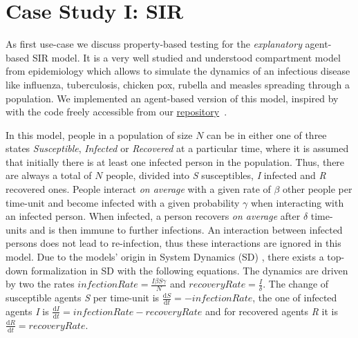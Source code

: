 \section{Case Study I: SIR}
\label{sec:case_SIR}
As first use-case we discuss property-based testing for the \textit{explanatory} agent-based SIR model. It is a very well studied and understood compartment model from epidemiology \cite{kermack_contribution_1927} which allows to simulate the dynamics of an infectious disease like influenza, tuberculosis, chicken pox, rubella and measles spreading through a population. We implemented an agent-based version of this model, inspired by  with the code freely accessible from our \href{https://github.com/thalerjonathan/haskell-sir}{repository}~\cite{sir_repo}.

In this model, people in a population of size $N$ can be in either one of three states \textit{Susceptible}, \textit{Infected} or \textit{Recovered} at a particular time, where it is assumed that initially there is at least one infected person in the population. Thus, there are always a total of $N$ people, divided into \textit{S} susceptibles, \textit{I} infected and \textit{R} recovered ones. People interact \textit{on average} with a given rate of $\beta$ other people per time-unit and become infected with a given probability $\gamma$ when interacting with an infected person. When infected, a person recovers \textit{on average} after $\delta$ time-units and is then immune to further infections. An interaction between infected persons does not lead to re-infection, thus these interactions are ignored in this model. Due to the models' origin in System Dynamics (SD) \cite{porter_industrial_1962}, there exists a top-down formalization in SD with the following equations. The dynamics are driven by two the rates $infectionRate = \frac{I \beta S \gamma}{N}$ and $recoveryRate = \frac{I}{\delta}$. The change of susceptible agents \textit{S} per time-unit is $\frac{\mathrm d S}{\mathrm d t} = -infectionRate$, the one of infected agents \textit{I} is $\frac{\mathrm d I}{\mathrm d t} = infectionRate - recoveryRate$ and for recovered agents \textit{R} it is $\frac{\mathrm d R}{\mathrm d t} = recoveryRate$.

